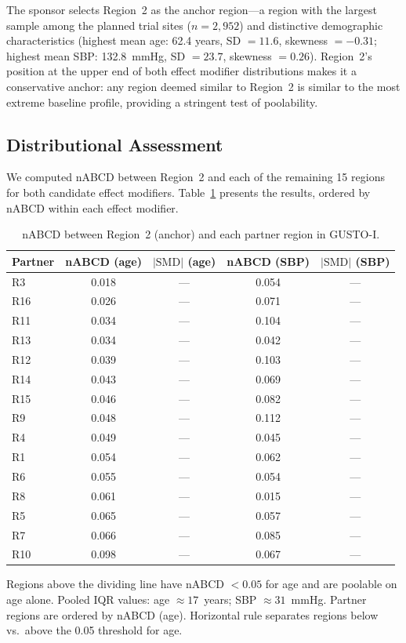 The sponsor selects Region~2 as the anchor region---a region with the largest sample among the planned trial sites ($n = 2{,}952$) and distinctive demographic characteristics (highest mean age: 62.4 years, SD $= 11.6$, skewness $= -0.31$; highest mean SBP: 132.8~mmHg, SD $= 23.7$, skewness $= 0.26$). Region~2's position at the upper end of both effect modifier distributions makes it a conservative anchor: any region deemed similar to Region~2 is similar to the most extreme baseline profile, providing a stringent test of poolability.

\subsection{Distributional Assessment}\label{sec:app_distributional}

We computed nABCD between Region~2 and each of the remaining 15 regions for both candidate effect modifiers. Table~\ref{tab:gusto_nabcd} presents the results, ordered by nABCD within each effect modifier.

\begin{table}[ht]
\caption{nABCD between Region~2 (anchor) and each partner region in GUSTO-I.\label{tab:gusto_nabcd}}
\begin{tabular*}{\textwidth}{@{\extracolsep\fill}lcccc@{}}
\toprule
\textbf{Partner} & \textbf{nABCD (age)} & \textbf{$|\text{SMD}|$ (age)} & \textbf{nABCD (SBP)} & \textbf{$|\text{SMD}|$ (SBP)} \\
\midrule
R3  & 0.018 & --- & 0.054 & --- \\
R16 & 0.026 & --- & 0.071 & --- \\
R11 & 0.034 & --- & 0.104 & --- \\
R13 & 0.034 & --- & 0.042 & --- \\
R12 & 0.039 & --- & 0.103 & --- \\
R14 & 0.043 & --- & 0.069 & --- \\
R15 & 0.046 & --- & 0.082 & --- \\
R9  & 0.048 & --- & 0.112 & --- \\
R4  & 0.049 & --- & 0.045 & --- \\
\addlinespace
R1  & 0.054 & --- & 0.062 & --- \\
R6  & 0.055 & --- & 0.054 & --- \\
R8  & 0.061 & --- & 0.015 & --- \\
R5  & 0.065 & --- & 0.057 & --- \\
R7  & 0.066 & --- & 0.085 & --- \\
R10 & 0.098 & --- & 0.067 & --- \\
\bottomrule
\end{tabular*}
\begin{tablenotes}
\item Regions above the dividing line have nABCD $< 0.05$ for age and are poolable on age alone. Pooled IQR values: age $\approx 17$~years; SBP $\approx 31$~mmHg. Partner regions are ordered by nABCD (age). Horizontal rule separates regions below vs.\ above the 0.05 threshold for age.
\end{tablenotes}
\end{table}

